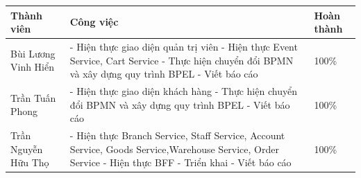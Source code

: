{
\setlength\extrarowheight{6pt}
\begin{longtable}{| p{4.5cm} | p{8cm} | p{2.5cm} |}

    \hline
    \textbf{Thành viên} & \textbf{Công việc}                                                                                         & \textbf{Hoàn thành} \\
    \hline
    Bùi Lương Vinh Hiển & - Hiện thực giao diện quản trị viên
    \newline
    - Hiện thực Event Service, Cart Service
    \newline
    - Thực hiện chuyển đổi BPMN và xây dựng quy trình BPEL
    \newline
    - Viết báo cáo      &
    100\%                                                                                                                                                  \\
    \hline
    Trần Tuấn Phong     & - Hiện thực giao diện khách hàng
    \newline
    - Thực hiện chuyển đổi BPMN và xây dựng quy trình BPEL
    \newline
    - Viết báo cáo      &
    100\%                                                                                                                                                  \\
    \hline
    Trần Nguyễn Hữu Thọ & - Hiện thực Branch Service, Staff Service, Account Service, Goods Service,Warehouse Service, Order Service
    \newline
    - Hiện thực BFF
    \newline
    - Triển khai
    \newline
    - Viết báo cáo      &
    100\%                                                                                                                                                  \\
    \hline
\end{longtable}

}